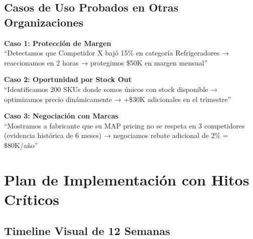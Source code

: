 \documentclass[12pt,a4paper]{article}
\begin{document}
\subsection{Casos de Uso Probados en Otras Organizaciones}

\begin{tcolorbox}[colback=successgreen!10, colframe=successgreen]
\textbf{Caso 1: Protección de Margen}\\
``Detectamos que Competidor X bajó 15\% en categoría Refrigeradores → reaccionamos en 2 horas → protegimos \$50K en margen mensual''
\end{tcolorbox}

\begin{tcolorbox}[colback=primaryblue!10, colframe=primaryblue]
\textbf{Caso 2: Oportunidad por Stock Out}\\
``Identificamos 200 SKUs donde somos únicos con stock disponible → optimizamos precio dinámicamente → +\$30K adicionales en el trimestre''
\end{tcolorbox}

\begin{tcolorbox}[colback=successgreen!10, colframe=successgreen]
\textbf{Caso 3: Negociación con Marcas}\\
``Mostramos a fabricante que su MAP pricing no se respeta en 3 competidores (evidencia histórica de 6 meses) → negociamos rebate adicional de 2\% = \$80K/año''
\end{tcolorbox}

\newpage
\section{Plan de Implementación con Hitos Críticos}

\subsection{Timeline Visual de 12 Semanas}
\end{document}
